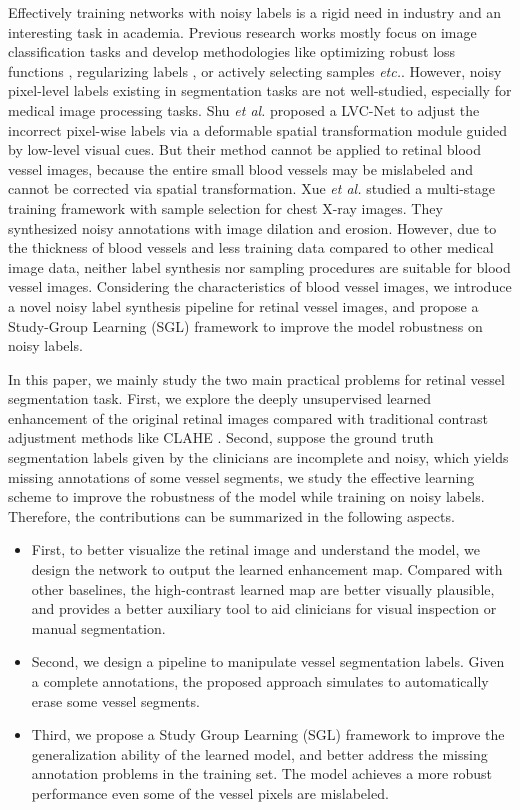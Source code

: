 \documentclass[runningheads]{llncs}
\begin{document}
Effectively training networks with noisy labels \cite{song2020learning} is a rigid need in industry and an interesting task in academia. Previous research works mostly focus on image classification tasks and develop methodologies like optimizing robust loss functions \cite{ghosh2017robust,zhang2018generalized}, regularizing labels \cite{goodfellow2014explaining,pereyra2017regularizing}, or actively selecting samples \cite{jiang2018mentornet,han2018co} \textit{etc.}. However, noisy pixel-level labels existing in segmentation tasks are not well-studied, especially for medical image processing tasks. Shu \textit{et al.} proposed a LVC-Net \cite{shu2019lvc} to adjust the incorrect pixel-wise labels via a deformable spatial transformation module guided by low-level visual cues. But their method cannot be applied to retinal blood vessel images, because the entire small blood vessels may be mislabeled and cannot be corrected via spatial transformation. Xue \textit{et al.} \cite{xue2020cascaded} studied a multi-stage training framework with sample selection for chest X-ray images. They synthesized noisy annotations with image dilation and erosion. However, due to the thickness of blood vessels and less training data compared to other medical image data, neither label synthesis nor sampling procedures are suitable for blood vessel images. Considering the characteristics of blood vessel images, we introduce a novel noisy label synthesis pipeline for retinal vessel images, and propose a Study-Group Learning (SGL) framework to improve the model robustness on noisy labels. 

In this paper, we mainly study the two main practical problems for retinal vessel segmentation task. First, we explore the deeply unsupervised learned enhancement of the original retinal images compared with traditional contrast adjustment methods like CLAHE \cite{pizer1987adaptive}. Second, suppose the ground truth segmentation labels given by the clinicians are incomplete and noisy, which yields missing annotations of some vessel segments, we study the effective learning scheme to improve the robustness of the model while training on noisy labels. Therefore, the contributions can be summarized in the following aspects. 
\begin{itemize}
  \item First, to better visualize the retinal image and understand the model, we design the network to output the learned enhancement map. Compared with other baselines, the high-contrast learned map are better visually plausible, and provides a better auxiliary tool to aid clinicians for visual inspection or manual segmentation.
  \item Second, we design a pipeline to manipulate vessel segmentation labels. Given a complete annotations, the proposed approach simulates to automatically erase some vessel segments. \item Third, we propose a Study Group Learning (SGL) framework to improve the generalization ability of the learned model, and better address the missing annotation problems in the training set. The model achieves a more robust performance even some of the vessel pixels are mislabeled.
\end{itemize}
\end{document}
